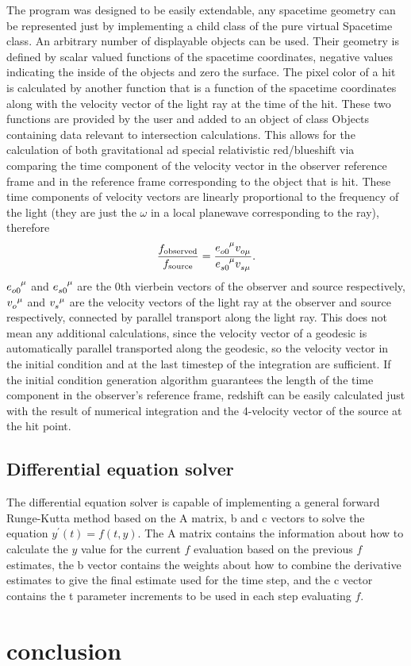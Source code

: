 \documentclass[pdftex,12pt,a4paper]{article}
\begin{document}
		The program was designed to be easily extendable, any spacetime geometry can be represented just by implementing a child class of the pure virtual Spacetime class. An arbitrary number of displayable objects can be used. Their geometry is defined by scalar valued functions of the spacetime coordinates, negative values indicating the inside of the objects and zero the surface. The pixel color of a hit is calculated by another function that is a function of the spacetime coordinates along with the velocity vector of the light ray at the time of the hit. These two functions are provided by the user and added to an object of class Objects containing data relevant to intersection calculations. This allows for the calculation of both gravitational ad special relativistic red/blueshift via comparing the time component of the velocity vector in the observer reference frame and in the reference frame corresponding to the object that is hit. These time components of velocity vectors are linearly proportional to the frequency of the light (they are just the $\omega$ in a local planewave corresponding to the ray), therefore
		\begin{equation}
			\frac{f_{\text{observed}}}{f_{\text{source}}} = \frac{\tensor{e}{_o_0^\mu}\tensor{v}{_o_\mu}}{\tensor{e}{_s_0^\mu}\tensor{v}{_s_\mu}}.
		\end{equation}
		$\tensor{e}{_o_0^\mu}$ and $\tensor{e}{_s_0^\mu}$ are the 0th vierbein vectors of the observer and source respectively, $\tensor{v}{_o^\mu}$ and $\tensor{v}{_s^\mu}$ are the velocity vectors of the light ray at the observer and source respectively, connected by parallel transport along the light ray. This does not mean any additional calculations, since the velocity vector of a geodesic is automatically parallel transported along the geodesic, so the velocity vector in the initial condition and at the last timestep of the integration are sufficient. If the initial condition generation algorithm guarantees the length of the time component in the observer's reference frame, redshift can be easily calculated just with the result of numerical integration and the 4-velocity vector of the source at the hit point. 
	\subsection{Differential equation solver}
		The differential equation solver is capable of implementing a general forward Runge-Kutta method based on the A matrix, b and c vectors to solve the equation $y^\prime(t) = f(t, y)$. The A matrix contains the information about how to calculate the $y$ value for the current $f$ evaluation based on the previous $f$ estimates, the b vector contains the weights about how to combine the derivative estimates to give the final estimate used for the time step, and the c vector contains the t parameter increments to be used in each step evaluating $f$.
	\section{conclusion}
		
	
    
\end{document}
